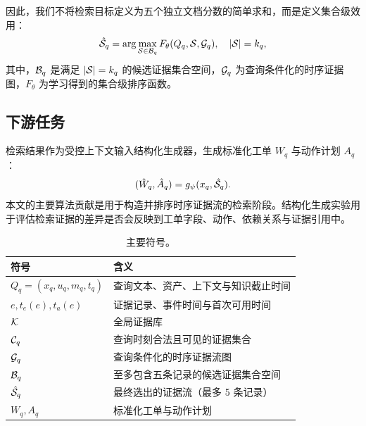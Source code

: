 因此，我们不将检索目标定义为五个独立文档分数的简单求和，而是定义集合级效用：
\begin{equation}
\hat{\mathcal{S}}_q
=
\arg\max_{\mathcal{S}\in\mathcal{B}_q}
F_{\theta}(Q_q,\mathcal{S},\mathcal{G}_q),
\quad |\mathcal{S}|=k_q,
\label{eq:set_selection}
\end{equation}
其中，$\mathcal{B}_q$ 是满足 $|\mathcal{S}|=k_q$ 的候选证据集合空间，$\mathcal{G}_q$ 为查询条件化的时序证据图，$F_{\theta}$ 为学习得到的集合级排序函数。

\subsection{下游任务}

检索结果作为受控上下文输入结构化生成器，生成标准化工单 $W_q$ 与动作计划 $A_q$：
\begin{equation}
(\hat W_q,\hat A_q)=g_{\psi}(x_q,\hat{\mathcal{S}}_q).
\label{eq:downstream_generation}
\end{equation}
本文的主要算法贡献是用于构造并排序时序证据流的检索阶段。结构化生成实验用于评估检索证据的差异是否会反映到工单字段、动作、依赖关系与证据引用中。

\begin{table}[t]
\caption{主要符号。}
\label{tab:symbols}
\centering
\small
\begin{tabular}{@{}p{}p{}@{}}
\toprule
符号 & 含义 \\
\midrule
$Q_q=(x_q,u_q,m_q,t_q)$ & 查询文本、资产、上下文与知识截止时间 \\
$e,t_e(e),t_a(e)$ & 证据记录、事件时间与首次可用时间 \\
$\mathcal{K}$ & 全局证据库 \\
$\mathcal{C}_q$ & 查询时刻合法且可见的证据集合 \\
$\mathcal{G}_q$ & 查询条件化的时序证据流图 \\
$\mathcal{B}_q$ & 至多包含五条记录的候选证据集合空间 \\
$\hat{\mathcal{S}}_q$ & 最终选出的证据流（最多 5 条记录） \\
$W_q,A_q$ & 标准化工单与动作计划 \\
\bottomrule
\end{tabular}
\end{table}
